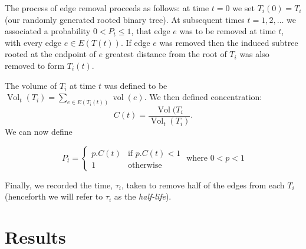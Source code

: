 \documentclass[12pt]{article} %
\theoremstyle{definition}
\DeclareMathOperator{\vol}{vol}
\DeclareMathOperator{\Vol}{Vol}
\begin{document}
The process of edge removal proceeds as follows:  at time $t=0$ we set $T_{i}(0) = T_{i}$ (our randomly generated rooted binary tree).  At subsequent times  $t = 1,2,\dots$ we associated a probability $0<P_{t}\leq 1$, that edge $e$ was to be removed at time $t$, with every edge $e \in E(T(t))$. If edge $e$ was removed then the induced subtree rooted at the endpoint of $e$ greatest distance from the root of $T_i$ was also removed to form $T_i(t)$.   

The volume of $T_i$ at time $t$ was defined to be $\Vol_{t}(T_i) = \sum_{e \in E(T_i(t))} \vol(e)$.  We then defined concentration: 
\[C(t) = \frac{\Vol(T_i}{\Vol_{t}(T_i)}.\]
We can now define %

\[P_t = \begin{cases} p.C(t) &\mbox{if } p.C(t) <1 \\
1 & \mbox{otherwise }  \end{cases} \text{  where   } 0<p<1 \]

Finally, we recorded the time, $\tau_{i}$, taken to remove half of the edges from each $T_{i}$ (henceforth we will refer to $\tau_i$ as the \emph{half-life}). 
 
\section{Results}  




\end{document}

